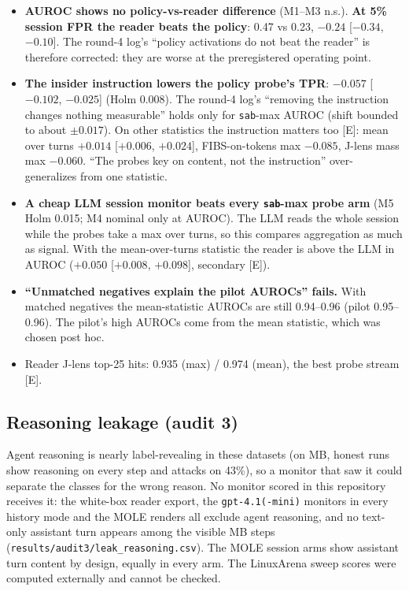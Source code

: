 \documentclass[11pt]{article}
\newcommand{\tE}{\textsf{\scriptsize\textcolor{ink2}{[E]}}\xspace}
\begin{document}
\begin{itemize}
\item \textbf{AUROC shows no policy-vs-reader difference} (M1--M3 n.s.). \textbf{At 5\% session FPR the reader beats the policy}: 0.47 vs 0.23, $-0.24$ [$-0.34$, $-0.10$]. The round-4 log's ``policy activations do not beat the reader'' is therefore corrected: they are worse at the preregistered operating point.
\item \textbf{The insider instruction lowers the policy probe's TPR}: $-0.057$ [$-0.102$, $-0.025$] (Holm 0.008). The round-4 log's ``removing the instruction changes nothing measurable'' holds only for \texttt{sab}-max AUROC (shift bounded to about $\pm0.017$). On other statistics the instruction matters too \tE: mean over turns $+0.014$ [$+0.006$, $+0.024$], FIBS-on-tokens max $-0.085$, J-lens mass max $-0.060$. ``The probes key on content, not the instruction'' over-generalizes from one statistic.
\item \textbf{A cheap LLM session monitor beats every \texttt{sab}-max probe arm} (M5 Holm 0.015; M4 nominal only at AUROC). The LLM reads the whole session while the probes take a max over turns, so this compares aggregation as much as signal. With the mean-over-turns statistic the reader is above the LLM in AUROC ($+0.050$ [$+0.008$, $+0.098$], secondary \tE).
\item \textbf{``Unmatched negatives explain the pilot AUROCs'' fails.} With matched negatives the mean-statistic AUROCs are still 0.94--0.96 (pilot 0.95--0.96). The pilot's high AUROCs come from the mean statistic, which was chosen post hoc.
\item Reader J-lens top-25 hits: 0.935 (max) / 0.974 (mean), the best probe stream \tE.
\end{itemize}

\subsection{Reasoning leakage (audit 3)}
Agent reasoning is nearly label-revealing in these datasets (on MB, honest runs show reasoning on every step and attacks on 43\%), so a monitor that saw it could separate the classes for the wrong reason. No monitor scored in this repository receives it: the white-box reader export, the \texttt{gpt-4.1(-mini)} monitors in every history mode and the MOLE renders all exclude agent reasoning, and no text-only assistant turn appears among the visible MB steps (\nolinkurl{results/audit3/leak_reasoning.csv}). The MOLE session arms show assistant turn content by design, equally in every arm. The LinuxArena sweep scores were computed externally and cannot be checked.
\end{document}

